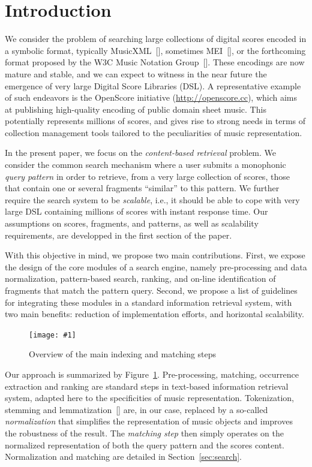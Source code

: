 \documentclass[letterpaper, 11pt]{article}
\newcommand{\fig}[2]
{
\begin{figure}[ht]
 \centerline{
 \texttt{[image: \#1]}}
 \caption{\label{#1} #2}
\end{figure}
}
\begin{document}
\section{Introduction}\label{sec:intro}

We consider the problem of searching large collections of digital scores
encoded in a symbolic format, 
typically MusicXML~[\cite{Good01}], sometimes MEI~[\cite{Rolland02,MEI_ws}],
or the forthcoming format proposed by the W3C Music Notation Group~[\cite{MNX}]. These encodings are now mature
and stable, and we can expect to witness in the near future the emergence
of very large Digital Score Libraries (DSL). A representative example of such endeavors is
the OpenScore initiative (\url{http://openscore.cc}), which aims at publishing high-quality encoding of
public domain sheet music. This potentially represents millions of scores, and
gives rise to strong needs in terms of collection management tools tailored to the
peculiarities of music representation.

In the present paper, we focus on the \emph{content-based retrieval} problem. 
We consider the common search mechanism where a user submits
a monophonic \emph{query pattern} in order to retrieve, from a very large
collection of scores, those that contain one or several fragments ``similar'' to this pattern. 
We further require the search system to be \emph{scalable}, i.e., it
should be able to cope with very large DSL containing millions of scores
with instant response time.  Our assumptions on scores, fragments, and patterns, as well as scalability 
requirements, are developped in the first section of the paper.

With this objective in mind, we propose two main contributions.
First, we expose the design of the core modules of a search engine, namely 
pre-processing and data normalization, pattern-based search, ranking, 
and on-line identification of fragments that match the  pattern query.  
Second, we propose a list of guidelines for integrating these modules in a standard information retrieval
system, with two main benefits: reduction of implementation efforts, and horizontal scalability.

\fig{../figures/matching-steps}{Overview of the main indexing and matching steps}

Our approach is summarized by Figure~\ref{../figures/matching-steps}. Pre-processing, matching,
occurrence extraction and ranking are standard steps in text-based information retrieval system, adapted 
here to
the specificities of music representation. Tokenization, stemming and lemmatization~[\cite{MRS08}] 
are, in our case, replaced by a so-called \emph{normalization}
that simplifies the representation of music objects and improves the robustness of the result. 
The \emph{matching step} then simply operates on the normalized representation
of both the query pattern and the scores content. Normalization
and matching are detailed in Section~\ref{sec:search}.
\end{document}

